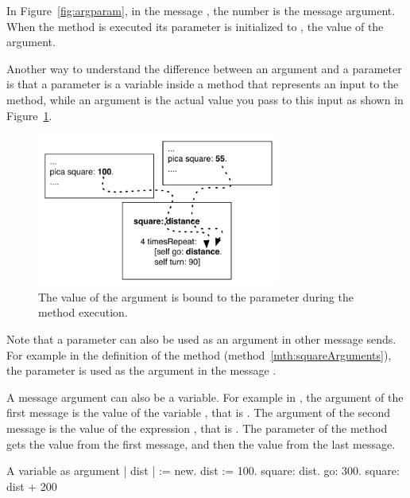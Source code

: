 In Figure~\ref{fig:argparam}, in the message , the number  is the message argument. When the method  is executed its parameter  is initialized to , the value of the argument. 

Another way to understand the difference between an argument and a parameter is that a parameter is a variable inside a method that represents an input  to the method, while an argument is the actual value you pass to this input as shown in Figure~\ref{fig:argparam4}.


\begin{figure}[h]
\begin{center}
\includegraphics[width=8cm]{argparam4}
\caption{The value of the argument is bound to the parameter during the method execution.\label{fig:argparam4}}
\end{center}
\end{figure}


Note that a parameter can also be used as an argument in other message sends. For example in the definition of the method  (method~\ref{mth:squareArguments}), the parameter  is used as the argument in the message .


A message argument can also be a variable. For example in , the argument of the first message  is the value of the variable , that is . The argument of the second message  is the value of the expression , that is . The parameter  of the method  gets the value from the first message, and then the value  from the last message. 

\begin{scriptwithtitle}{A variable as argument}\label{scr:varasArg}
| \caro dist |
\caro := \Turtle new.
dist := 100. 
\caro square: dist.
\caro go: 300.
\caro square: dist + 200
\end{scriptwithtitle}









